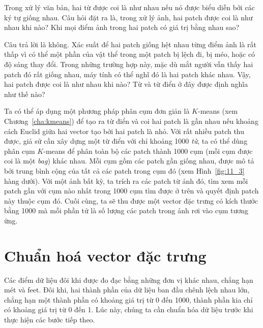Trong xử lý văn bản, hai từ được coi là như nhau nếu nó được biểu diễn bởi các
ký tự giống nhau. Câu hỏi đặt ra là, trong xử lý ảnh, hai patch được coi là như
nhau khi nào? Khi mọi điểm ảnh trong hai patch có giá trị bằng nhau sao?
 
Câu trả lời là không. Xác suất để hai patch giống hệt nhau từng điểm ảnh là rất
thấp vì có thể một phần của vật thể trong một patch bị lệch đi, bị
méo, hoặc có độ sáng thay đổi. Trong những trường hợp này, mặc dù mắt người vẫn
thấy hai patch đó {rất giống nhau}, máy tính có thể nghĩ đó là hai patch
khác nhau. Vậy, hai patch được coi là như nhau khi nào? Từ và {từ điển} ở
đây được định nghĩa như thế nào?
 
 
Ta có thể áp dụng một phương pháp phân cụm đơn giản là $K$-means
(xem Chương~\ref{cha:kmeans}) để tạo ra từ điển và coi hai patch là gần nhau nếu
khoảng cách Euclid giữa hai vector tạo bởi hai patch là nhỏ. Với rất nhiều patch
thu được, giả sử cần xây dựng một từ điển với chỉ khoảng 1000 \textit{từ}, ta có
thể dùng phân cụm $K$-means để phân toàn bộ các patch thành 1000 cụm (mỗi
cụm được coi là một \textit{bag}) khác nhau. Mỗi cụm gồm các patch gần giống
nhau, được mô tả bởi trung bình cộng của tất cả các patch trong cụm đó (xem
Hình~\ref{fig:11_3} hàng dưới). Với một ảnh bất kỳ, ta trích ra các patch từ ảnh
đó, tìm xem mỗi patch gần với cụm nào nhất trong 1000 cụm tìm được ở trên và
quyết định patch này thuộc cụm đó. Cuối cùng, ta sẽ thu được một vector đặc
trưng có kích thước bằng 1000 mà mỗi phần tử là số lượng các patch trong ảnh rơi
vào cụm tương ứng.


\section{Chuẩn hoá vector đặc trưng}
 
Các điểm dữ liệu đôi khi được đo đạc bằng những đơn vị khác nhau, chẳng hạn mét
và feet. Đôi khi, hai thành phần của dữ liệu ban đầu chênh lệch nhau lớn, chẳng
hạn một thành phần có khoảng giá trị từ 0 đến 1000, thành phần kia chỉ có khoảng
giá trị từ 0 đến 1. Lúc này, chúng ta cần chuẩn hóa dữ liệu trước khi thực hiện
các bước tiếp theo.
 
